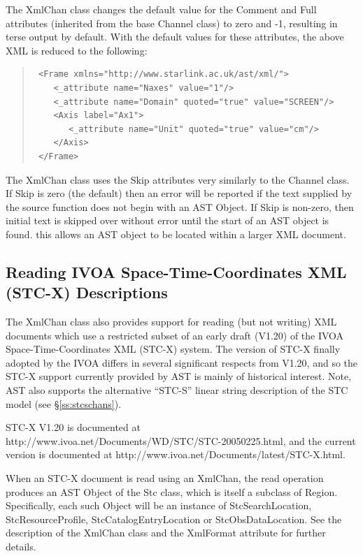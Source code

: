 \documentclass[twoside,11pt]{article}
\newcommand{\htmladdnormallink}[2]{#1}
\newcommand{\secref}[1]{\S\ref{#1}}
\newcommand{\secref}[1]{\ref{#1}}
\begin{document}
The XmlChan class changes the default value for the Comment and Full
attributes (inherited from the base Channel class) to zero and -1,
resulting in terse output by default. With the default values for these
attributes, the above XML is reduced to the following:

\begin{quote}
\small
\begin{verbatim}
 <Frame xmlns="http://www.starlink.ac.uk/ast/xml/">
    <_attribute name="Naxes" value="1"/>
    <_attribute name="Domain" quoted="true" value="SCREEN"/>
    <Axis label="Ax1">
       <_attribute name="Unit" quoted="true" value="cm"/>
    </Axis>
 </Frame>
\end{verbatim}
\normalsize
\end{quote}


The XmlChan class uses the Skip attributes very similarly to the Channel
class. If Skip is zero (the default) then an error will be reported if the text
supplied by the source function does not begin with an AST Object. If
Skip is non-zero, then initial text is skipped over without error until
the start of an AST object is found. this allows an AST object to be
located within a larger XML document.

\subsection{Reading IVOA Space-Time-Coordinates XML (STC-X) Descriptions}
The XmlChan class also provides support for reading (but not writing) XML
documents which use a restricted subset of an early draft (V1.20) of the
IVOA Space-Time-Coordinates XML (STC-X) system. The version of STC-X
finally adopted by the IVOA differs in several significant respects from
V1.20, and so the STC-X support currently provided by AST is mainly of
historical interest. Note, AST also supports the alternative ``STC-S''
linear string description of the STC model (see \secref{ss:stcschans}).

STC-X V1.20 is documented at \htmladdnormallink{
http://www.ivoa.net/Documents/WD/STC/STC-20050225.html}{
http://www.ivoa.net/Documents/WD/STC/STC-20050225.html}, and the current
version is documented at \htmladdnormallink{
http://www.ivoa.net/Documents/latest/STC-X.html}{
http://www.ivoa.net/Documents/latest/STC-X.html}.

When an STC-X document is read using an XmlChan, the read operation
produces an AST Object of the Stc class, which is itself a subclass of
Region. Specifically, each such Object will be an instance of
StcSearchLocation, StcResourceProfile, StcCatalogEntryLocation or
StcObsDataLocation. See the description of the XmlChan class and the
XmlFormat attribute for further details.
\end{document}
